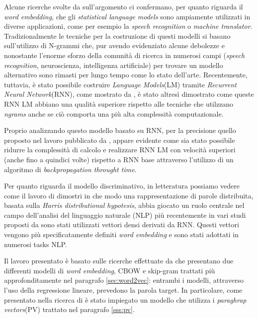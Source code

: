 \documentclass[a4paper,12pt,openright,twoside]{report}
\theoremstyle{definition}
\begin{document}
Alcune ricerche svolte da \cite{Miktesi} sull'argomento ci confermano, per quanto riguarda
il \emph{word embedding}, che 
gli \emph{statistical language models} sono ampiamente utilizzati
in diverse applicazioni, come per esempio la \emph{speech recognition} o \emph{machine translator}.
Tradizionalmente le tecniche per la costruzione di questi modelli si basano sull'utilizzo di 
N-grammi che,
pur avendo evidenziato alcune debolezze e nonostante l'enorme sforzo della
comunità di ricerca in numerosi campi (\emph{speech recognition}, neuroscienza, intelligenza
artificiale) per trovare un modello alternativo sono rimasti per lungo tempo come lo stato dell'arte.
Recentemente, tuttavia, è stato possibile costruire \emph{Language Models}(LM) 
tramite \emph{Recurrent Neural Network}(RNN), come mostrato da \cite{Mik2010,MikEmp},
è stato altresì dimostrato come queste RNN LM abbiano una qualità superiore rispetto alle tecniche
che utilzzano \emph{n\-grams} anche se ciò comporta una più alta complessità computazionale.

Proprio analizzando questo modello basato su RNN, per la precisione quello
proposto nel lavoro pubblicato da \cite{MikRNN}, appare evidente come sia
stato possibile ridurre la complessità  di calcolo e realizzare RNN LM con
velocità superiori (anche fino a quindici volte) rispetto a RNN base attraverso l'utilizzo
di un algoritmo di \emph{backpropagation throught time}.

Per quanto riguarda il modello discriminativo, in letteratura possiamo vedere come il lavoro di \cite{Baroni2010}
dimostri in che modo una rappresentazione di parole distribuita, 
basata sulla \emph{Harris distributional hypotesis},
abbia giocato un ruolo centrale nel campo dell'analisi del linguaggio naturale (NLP)
più recentemente in vari studi proposti da 
\cite{Collobert2011, Mik20131, Mik2013} 
sono stati utilizzati vettori densi derivati da RNN. Questi vettori vengono più specificatamente
definiti \emph{word embedding} e sono stati adottati in numerosi tasks NLP.

Il lavoro presentato è basato sulle ricerche effettuate da \cite{Mik2013}
che presentano due differenti modelli di \emph{word embedding}, CBOW e 
skip-gram trattati più approfonditamente nel paragrafo \ref{sec:word2vec}:
entrambi i modelli,
attraverso l'uso della regressione lineare, prevedono la parola target.
In particolare, come presentato nella ricerca di \cite{Mik2014}
è stato impiegato
un modello che utilizza i \emph{paraghrap vectors}(PV) trattato nel paragrafo \ref{sss:pv}.
\end{document}
